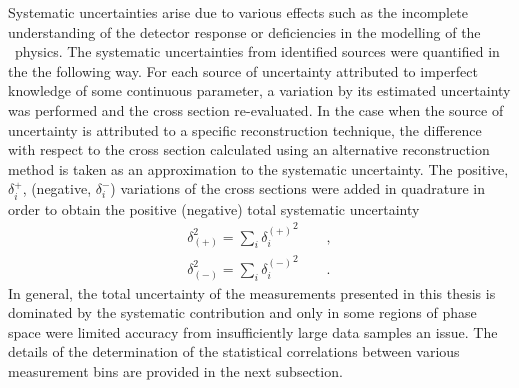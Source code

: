 Systematic uncertainties arise due to various effects such as the incomplete understanding of the detector response or deficiencies in the modelling of the \ep~physics. The systematic uncertainties from identified sources were quantified in the the following way. For each source of uncertainty attributed to imperfect knowledge of some continuous parameter, a variation by its estimated uncertainty was performed and the cross section re-evaluated. In the case when the source of uncertainty is attributed to a specific reconstruction technique, the difference with respect to the cross section calculated using an alternative reconstruction method is taken as an approximation to the systematic uncertainty. The positive, $\delta^+_i$, (negative, $\delta^-_i$) variations of the cross sections were added in quadrature in order to obtain the positive (negative) total systematic uncertainty
\[
	\begin{aligned}
		\delta_{\left( +\right)}^{2} = \sum_i{\mbox{$\delta_i^{\left( +\right)}$}^2}\qquad,\\
		\delta_{\left( -\right)}^{2} = \sum_i{\mbox{$\delta_i^{\left( -\right)}$}^2}\qquad.
	\end{aligned}
\]
In general, the total uncertainty of the measurements presented in this thesis is dominated by the systematic contribution and only in some regions of phase space were limited accuracy from insufficiently large data samples an issue. The details of the determination of the statistical correlations between various measurement bins are provided in the next subsection.

